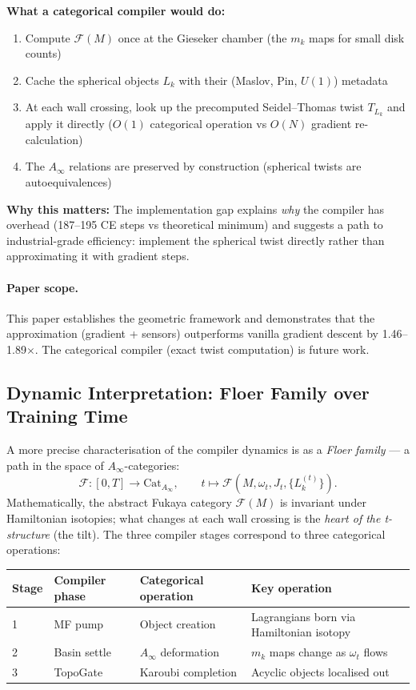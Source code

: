 \documentclass[11pt]{amsart}
\begin{document}
\textbf{What a categorical compiler would do:}
\begin{enumerate}
\item Compute $\mathcal{F}(M)$ once at the Gieseker chamber
  (the $m_k$ maps for small disk counts)
\item Cache the spherical objects $L_k$ with their
  (Maslov, Pin, $U(1)$) metadata
\item At each wall crossing, look up the precomputed
  Seidel--Thomas twist $T_{L_k}$ and apply it directly
  ($O(1)$ categorical operation vs $O(N)$ gradient re-calculation)
\item The $A_\infty$ relations are preserved by construction
  (spherical twists are autoequivalences)
\end{enumerate}

\textbf{Why this matters:}
The implementation gap explains \emph{why} the compiler has overhead
(187--195 CE steps vs theoretical minimum) and suggests a path to
industrial-grade efficiency: implement the spherical twist directly
rather than approximating it with gradient steps.

\paragraph{Paper scope.}
This paper establishes the geometric framework and demonstrates that
the approximation (gradient + sensors) outperforms vanilla gradient
descent by 1.46--1.89$\times$.
The categorical compiler (exact twist computation) is future work.

\subsection{Dynamic Interpretation: Floer Family over Training Time}

A more precise characterisation of the compiler dynamics is as a
\emph{Floer family} --- a path in the space of $A_\infty$-categories:
\[
  \mathcal{F}: [0,T] \to \mathrm{Cat}_{A_\infty}, \qquad
  t \mapsto \mathcal{F}(M, \omega_t, J_t, \{L_k^{(t)}\}).
\]
Mathematically, the abstract Fukaya category $\mathcal{F}(M)$ is invariant
under Hamiltonian isotopies; what changes at each wall crossing is the
\emph{heart of the t-structure} (the tilt).
The three compiler stages correspond to three categorical operations:

\begin{center}\small
\begin{tabular}{@{}llll@{}}
\toprule
Stage & Compiler phase & Categorical operation & Key operation \\
\midrule
1 & MF pump & Object creation & Lagrangians born via Hamiltonian isotopy \\
2 & Basin settle & $A_\infty$ deformation & $m_k$ maps change as $\omega_t$ flows \\
3 & TopoGate & Karoubi completion & Acyclic objects localised out \\
\bottomrule
\end{tabular}
\end{center}
\end{document}

